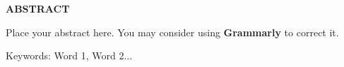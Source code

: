 \begin{center}
\textbf{ABSTRACT}
\end{center}

$\!$\\
\noindent
Place your abstract here. You may consider using \textbf{Grammarly} to correct it. 

\vspace{1cm}

\hspace{-1.3cm}Keywords: Word 1, Word 2...
